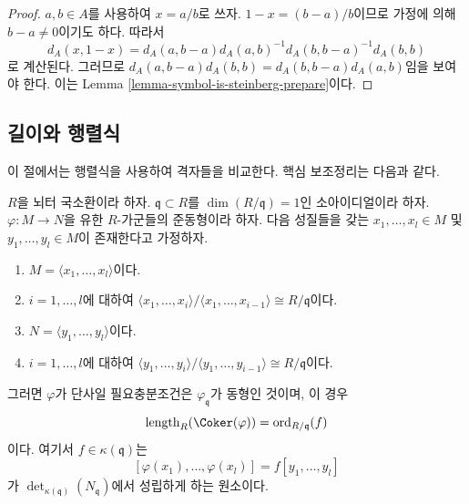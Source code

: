 \begin{proof}
$a, b \in A$를 사용하여 $x = a/b$로 쓰자. $1 - x = (b - a)/b$이므로
가정에 의해 $b - a \not = 0$이기도 하다. 따라서
$$
d_A(x, 1 - x)
=
d_A(a, b - a)d_A(a, b)^{-1}d_A(b, b - a)^{-1}d_A(b, b)
$$
로 계산된다. 그러므로
$d_A(a, b - a) d_A(b, b) = d_A(b, b - a) d_A(a, b)$임을 보여야 한다.
이는 Lemma \ref{lemma-symbol-is-steinberg-prepare}이다.
\end{proof}










\subsection{길이와 행렬식}
\label{subsection-length-determinant}

\noindent
이 절에서는 행렬식을 사용하여 격자들을 비교한다. 핵심 보조정리는
다음과 같다.

\begin{lemma}
\label{lemma-key-lemma}
$R$을 뇌터 국소환이라 하자. $\mathfrak q \subset R$를
$\dim(R/\mathfrak q) = 1$인 소아이디얼이라 하자.
$\varphi : M \to N$을 유한 $R$-가군들의 준동형이라 하자.
다음 성질들을 갖는 $x_1, \ldots, x_l \in M$ 및
$y_1, \ldots, y_l \in M$이 존재한다고 가정하자.
\begin{enumerate}
\item $M = \langle x_1, \ldots, x_l\rangle$이다.
\item $i = 1, \ldots, l$에 대하여
$\langle x_1, \ldots, x_i\rangle / \langle x_1, \ldots, x_{i - 1}\rangle
\cong R/\mathfrak q$이다.
\item $N = \langle y_1, \ldots, y_l\rangle$이다.
\item $i = 1, \ldots, l$에 대하여
$\langle y_1, \ldots, y_i\rangle / \langle y_1, \ldots, y_{i - 1}\rangle
\cong R/\mathfrak q$이다.
\end{enumerate}
그러면 $\varphi$가 단사일 필요충분조건은 $\varphi_{\mathfrak q}$가
동형인 것이며, 이 경우
$$
\text{length}_R(\Coker(\varphi)) = \text{ord}_{R/\mathfrak q}(f)
$$
이다. 여기서 $f \in \kappa(\mathfrak q)$는
$$
[\varphi(x_1), \ldots, \varphi(x_l)] = f [y_1, \ldots, y_l]
$$
가 $\det_{\kappa(\mathfrak q)}(N_{\mathfrak q})$에서 성립하게 하는
원소이다.
\end{lemma}

